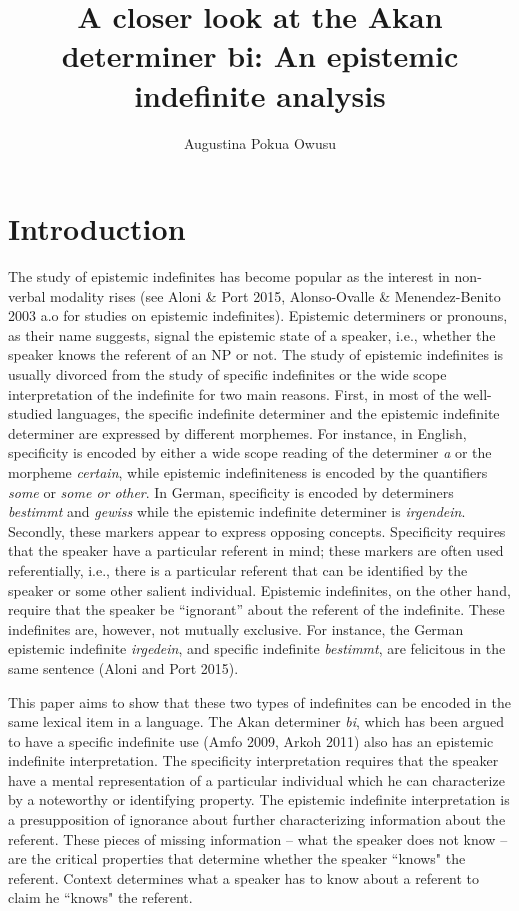 \documentclass[output=paper,modfonts]{langsci/langscibook}
\title{A closer look at the Akan determiner bi: An epistemic indefinite analysis}
\author{ Augustina Pokua Owusu\affiliation{Rutgers University}}
\begin{document}
\maketitle

\section{Introduction} 
The study of epistemic indefinites has become popular as the interest in non-verbal modality rises (see Aloni \& Port 2015, Alonso-Ovalle \& Menendez-Benito 2003 a.o for studies on epistemic indefinites). Epistemic determiners or pronouns, as their name suggests, signal the epistemic state of a speaker, i.e., whether the speaker knows the referent of an NP or not. The study of epistemic indefinites is usually divorced from the study of specific indefinites or the wide scope interpretation of the indefinite for two main reasons. First, in most of the well-studied languages, the specific indefinite determiner and the epistemic indefinite determiner are expressed by different morphemes. For instance, in English, specificity is encoded by either a wide scope reading of the determiner \emph{a} or the morpheme \emph{certain}, while epistemic indefiniteness is encoded by the quantifiers \emph{some} or \emph{some or other}. In German, specificity is encoded by determiners \emph{bestimmt} and \emph{gewiss} while the epistemic indefinite determiner is \emph{irgendein}. Secondly, these markers appear to express opposing concepts. Specificity requires that the speaker have a particular referent in mind; these markers are often used referentially, i.e., there is a particular referent that can be identified by the speaker or some other salient individual. Epistemic indefinites, on the other hand, require that the speaker be ``ignorant'' about the referent of the indefinite. These indefinites are, however, not mutually exclusive. For instance, the German epistemic indefinite \emph{irgedein}, and specific indefinite \emph{bestimmt}, are felicitous in the same sentence (Aloni and Port 2015).

This paper aims to show that these two types of indefinites can be encoded in the same lexical item in a language. The Akan determiner \emph{bi}, which has been argued to have a specific indefinite use (Amfo 2009, Arkoh 2011) also has an epistemic indefinite interpretation. The specificity interpretation requires that the speaker have a mental representation of a particular individual which he can characterize by a noteworthy or identifying property. The epistemic indefinite interpretation is a presupposition of ignorance about further characterizing information about the referent. These pieces of missing information -- what the speaker does not know -- are the critical properties that determine whether the speaker ``knows" the referent. Context determines what a speaker has to know about a referent to claim he ``knows" the referent.
\end{document}
